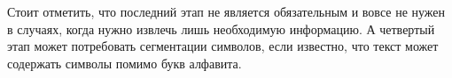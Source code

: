 Стоит отметить, что последний этап не является обязательным и вовсе не нужен в случаях, когда нужно извлечь лишь необходимую информацию. А четвертый этап может потребовать сегментации символов, если известно, что текст может содержать символы помимо букв алфавита. 


%
